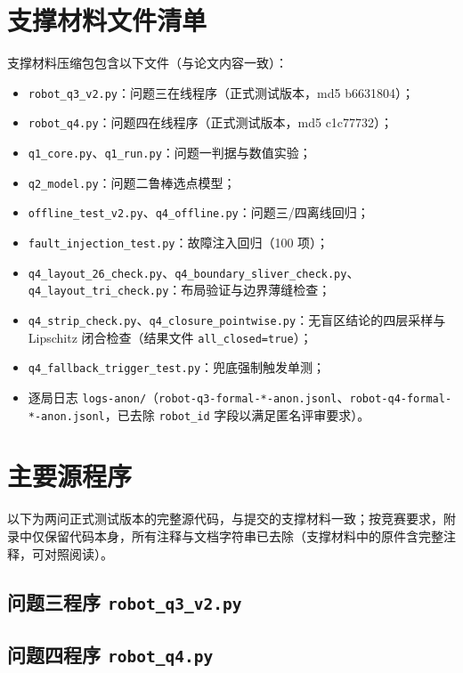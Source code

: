 \documentclass[12pt,a4paper]{ctexart}
\begin{document}
\appendix
{}

\section{支撑材料文件清单}

支撑材料压缩包包含以下文件（与论文内容一致）：

\begin{itemize}[leftmargin=2em,itemsep=2pt]
  \item \verb|robot_q3_v2.py|：问题三在线程序（正式测试版本，md5 b6631804）；
  \item \verb|robot_q4.py|：问题四在线程序（正式测试版本，md5 c1c77732）；
  \item \verb|q1_core.py|、\verb|q1_run.py|：问题一判据与数值实验；
  \item \verb|q2_model.py|：问题二鲁棒选点模型；
  \item \verb|offline_test_v2.py|、\verb|q4_offline.py|：问题三/四离线回归；
  \item \verb|fault_injection_test.py|：故障注入回归（100 项）；
  \item \verb|q4_layout_26_check.py|、\verb|q4_boundary_sliver_check.py|、\verb|q4_layout_tri_check.py|：布局验证与边界薄缝检查；
  \item \verb|q4_strip_check.py|、\verb|q4_closure_pointwise.py|：无盲区结论的四层采样与 Lipschitz 闭合检查（结果文件 \verb|all_closed=true|）；
  \item \verb|q4_fallback_trigger_test.py|：兜底强制触发单测；
  \item 逐局日志 \verb|logs-anon/|（\verb|robot-q3-formal-*-anon.jsonl|、\verb|robot-q4-formal-*-anon.jsonl|，已去除 \verb|robot_id| 字段以满足匿名评审要求）。
\end{itemize}

\section{主要源程序}

以下为两问正式测试版本的完整源代码，与提交的支撑材料一致；按竞赛要求，附录中仅保留代码本身，所有注释与文档字符串已去除（支撑材料中的原件含完整注释，可对照阅读）。

\subsection{问题三程序 \texttt{robot\_q3\_v2.py}}



\subsection{问题四程序 \texttt{robot\_q4.py}}


\end{document}

